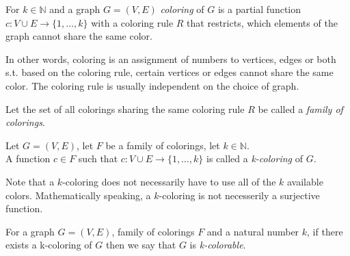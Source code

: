 \begin{definition}
    For $k \in \mathbb{N}$ and a graph $G=(V,E)$ \textit{coloring} of $G$ is a partial function $c: V \cup E \rightarrow \{1,\ldots,k\}$ with a coloring rule $R$ that restricts, which elements of the graph cannot share the same color.
\end{definition}


In other words, coloring is an assignment of numbers to vertices, edges or both s.t. based on the coloring rule, certain vertices or edges cannot share the same color. The coloring rule is usually independent on the choice of graph.

\begin{definition}
    Let the set of all colorings sharing the same coloring rule $R$ be called a \textit{family of colorings}.
\end{definition}

\begin{definition}
    Let $G=(V,E)$, let $F$ be a family of colorings, let $k \in \mathbb{N}$. \\ A function $c \in F$ such that $c: V \cup E \rightarrow \{1,\ldots,k\}$ is called a \textit{k-coloring} of $G$.
\end{definition}

Note that a $k$-coloring does not necessarily have to use all of the $k$ available colors. Mathematically speaking, a $k$-coloring is not necesserily a surjective function.

\begin{definition}
    For a graph $G=(V,E)$, family of colorings $F$ and a natural number $k$, if there exists a k-coloring of $G$ then we say that $G$ is \textit{k-colorable}.
\end{definition}

